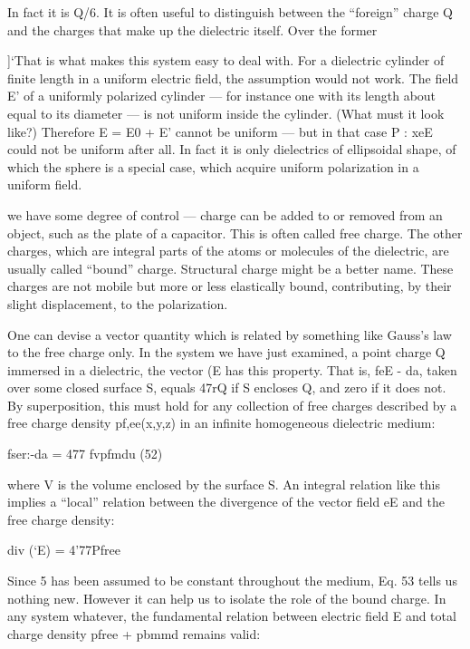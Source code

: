 {{In fact it is Q/6.
It is often useful to distinguish between the ``foreign'' charge Q
and the charges that make up the dielectric itself. Over the former

]‘That is what makes this system easy to deal with. For a dielectric cylinder of
finite length in a uniform electric field, the assumption would not work. The field E'
of a uniformly polarized cylinder --- for instance one with its length about equal to its
diameter --- is not uniform inside the cylinder. (What must it look like?) Therefore
E = E0 + E' cannot be uniform --- but in that case P : xeE could not be uniform after
all. In fact it is only dielectrics of ellipsoidal shape, of which the sphere is a special
case, which acquire uniform polarization in a uniform field.

we have some degree of control --- charge can be added to or removed
from an object, such as the plate of a capacitor. This is often called
free charge. The other charges, which are integral parts of the atoms
or molecules of the dielectric, are usually called ``bound'' charge.
Structural charge might be a better name. These charges are not
mobile but more or less elastically bound, contributing, by their
slight displacement, to the polarization.

One can devise a vector quantity which is related by something
like Gauss's law to the free charge only. In the system we have just
examined, a point charge Q immersed in a dielectric, the vector (E
has this property. That is, feE - da, taken over some closed surface S,
equals 47rQ if S encloses Q, and zero if it does not. By superposition,
this must hold for any collection of free charges described by a free
charge density pf,ee(x,y,z) in an infinite homogeneous dielectric
medium:

\begin{equation}
\end{equation}
fser:-da = 477 fvpfmdu (52)

where V is the volume enclosed by the surface S. An integral relation
like this implies a ``local'' relation between the divergence of
the vector field eE and the free charge density:

\begin{equation}
\end{equation}
div (‘E) = 4'77Pfree 

Since 5 has been assumed to be constant throughout the medium,
Eq. 53 tells us nothing new. However it can help us to isolate the
role of the bound charge. In any system whatever, the fundamental
relation between electric field E and total charge density pfree + pbmmd
remains valid:

}}
